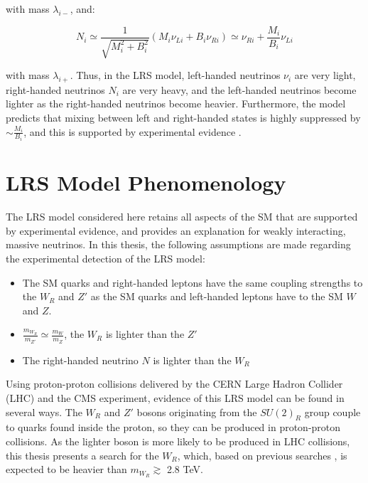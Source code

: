 with mass $\lambda_{i-}$, and:

\begin{equation}
	N_{i} \simeq \frac{1}{\sqrt{M^{2}_{i} + B^{2}_{i}}}(M_{i}\nu_{Li} + B_{i}\nu_{Ri}) \simeq \nu_{Ri} + \frac{M_{i}}{B_{i}}\nu_{Li}
\end{equation}

with mass $\lambda_{i+}$.  Thus, in the LRS model, left-handed neutrinos $\nu_{i}$ are very light,  
right-handed neutrinos $N_{i}$ are very heavy, and the left-handed neutrinos become lighter as 
the right-handed neutrinos become heavier.  Furthermore, the model predicts that mixing between left 
and right-handed states is highly suppressed by $\sim \frac{M_{i}}{B_{i}}$, and this is supported by 
experimental evidence \cite{dZeroMixingLimits,theoreticalMixingLimits}.


\section{LRS Model Phenomenology}
The LRS model considered here retains all aspects of the SM that are supported by experimental 
evidence, and provides an explanation for weakly interacting, massive neutrinos.  In this thesis, the 
following assumptions are made regarding the experimental detection of the LRS model:

\begin{itemize}
	\item The SM quarks and right-handed leptons have the same coupling strengths to the $W_{R}$ and $Z'$ 
		as the SM quarks and left-handed leptons have to the SM $W$ and $Z$.
	\item $\frac{m_{W_{R}}}{m_{Z'}} \simeq \frac{m_{W}}{m_{Z}}$, the $W_{R}$ is lighter than the $Z'$
	\item The right-handed neutrino $N$ is lighter than the $W_{R}$
\end{itemize}

Using proton-proton collisions delivered by the CERN Large Hadron Collider (LHC) and the CMS experiment, 
evidence of this LRS model can be found in several ways.  The $W_{R}$ and $Z'$ 
bosons originating from the $SU(2)_{R}$ group couple to quarks found inside the proton, so they 
can be produced in proton-proton collisions.  As the lighter boson is more likely to be 
produced in LHC collisions, this thesis presents a search for the $W_{R}$, which, 
based on previous searches \cite{cmsWRRunOneResults}, is expected to be heavier than $m_{W_{R}} \gtrsim$ 2.8 TeV.

